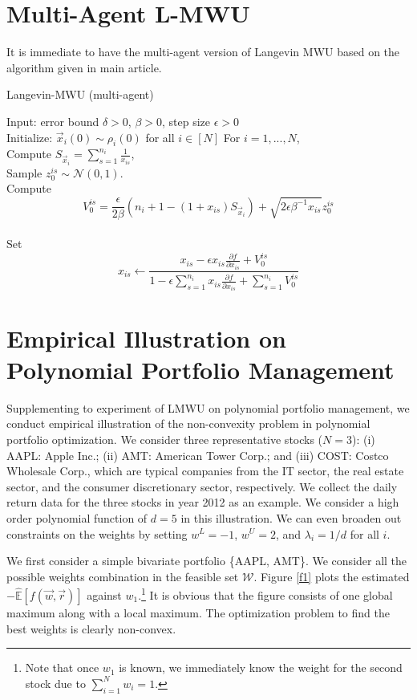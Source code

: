 \appendix
\onecolumn

\section{Multi-Agent L-MWU}
It is immediate to have the multi-agent version of Langevin MWU based on the algorithm given in main article.
\begin{algorithm}
\caption{Langevin-MWU (multi-agent) }
\label{alg:C2}
\begin{algorithmic}
\STATE Input: error bound $\delta>0$, $\beta>0$, step size $\epsilon>0$ 
\\
Initialize: $\vec{x}_i(0)\sim\rho_i(0)$ for all $i\in[N]$
\REPEAT
\STATE For $i=1,...,N$, 
\\
Compute 
$S_{\vec{x}_i}=\sum_{s=1}^{n_i}\frac{1}{x_{is}}$, 
\\
Sample $z_0^{is}\sim\mathcal{N}(0,1)$.
\\
Compute \[V_0^{is}=\frac{\epsilon}{2\beta}\left(n_i+1-(1+x_{is})S_{\vec{x}_i}\right)+\sqrt{2\epsilon\beta^{-1} x_{is}}z_0^{is}\]
\\
Set \[x_{is}\leftarrow\frac{x_{is}-\epsilon x_{is}\frac{\partial f}{\partial x_{is}}+V_0^{is}}{1-\epsilon\sum_{s=1}^{n_i}x_{is}\frac{\partial f}{\partial x_{is}}+\sum_{s=1}^{n_i}V_0^{is}}\]
\end{algorithmic}
\end{algorithm}

\section{Empirical Illustration on Polynomial Portfolio Management}
Supplementing to experiment of LMWU on polynomial portfolio management, we conduct empirical illustration of the non-convexity problem in polynomial portfolio optimization. We consider three representative stocks ($N=3$): (i) AAPL: Apple Inc.; (ii) AMT: American Tower Corp.; and (iii) COST: Costco Wholesale Corp., which are typical companies from the IT sector, the real estate sector, and the consumer discretionary sector, respectively. We collect the daily return data for the three stocks in year 2012 as an example. We consider a high order polynomial function of $d = 5$ in this illustration. We can even broaden out constraints on the weights by setting $w^L = -1$, $w^U = 2$, and $\lambda_i = 1/d$ for all $i$. 

We first consider a simple bivariate portfolio \{AAPL, AMT\}. We consider all the possible weights combination in the feasible set $\mathcal{W}$. Figure \ref{f1} plots the estimated $ -\hat{\mathbb{E}}[f(\vec{ w}, \vec{r})]$ against $w_1$.\footnote{Note that once $w_1$ is known, we immediately know the weight for the second stock due to $\sum^N_{i=1} w_i = 1$. } It is obvious that the figure consists of one global maximum along with a local maximum. The optimization problem to find the best weights is clearly non-convex. 

